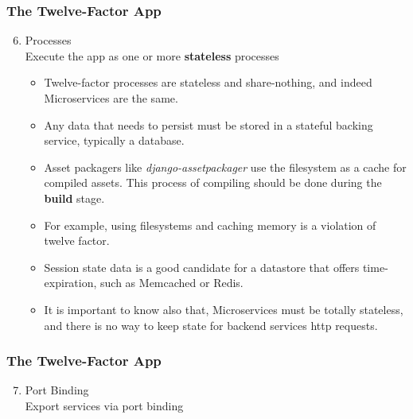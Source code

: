 \documentclass{beamer}
\begin{document}
	\begin{frame}
		\frametitle{The Twelve-Factor App}
			\begin{enumerate}
				\setcounter{enumi}{5}
				\item Processes \\
				\hspace{2mm} \small{Execute the app as one or more \textbf{stateless} processes}
				\vspace{2mm}
				\begin{itemize}
					\item<1-> \scriptsize {Twelve-factor processes are stateless and share-nothing, and indeed Microservices are the same.}
					\vspace{2mm}
					\item<2-> \scriptsize {Any data that needs to persist must be stored in a stateful backing service, typically a database.}
					\vspace{2mm}
					\item<3-> \scriptsize {Asset packagers like \textit{django-assetpackager} use the filesystem as a cache for compiled assets. This process of compiling should be done during the \textbf{build} stage.}
					\vspace{2mm}
					\item<4-> \scriptsize {For example, using filesystems and caching memory is a violation of twelve factor.}
					\vspace{2mm}
					\item<5-> \scriptsize {Session state data is a good candidate for a datastore that offers time-expiration, such as Memcached or Redis.}
					\vspace{2mm}
					\item<6-> \scriptsize {It is important to know also that, Microservices must be totally stateless, and there is no way to keep state for backend services http requests.}
				\end{itemize}
			\end{enumerate}
		\vspace{20mm}
	\end{frame}
	
	\begin{frame}
		\frametitle{The Twelve-Factor App}
		\begin{enumerate}
			\setcounter{enumi}{6}
			\item Port Binding \\
			\hspace{2mm} \scriptsize{Export services via port binding}
		\end{enumerate}
		\vspace{100mm}
	\end{frame}
\end{document}
